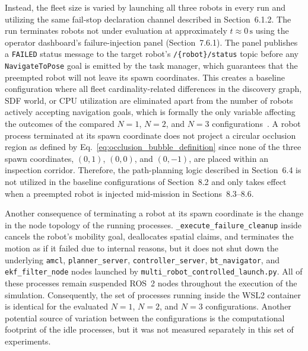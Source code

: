 Instead, the fleet size is varied by launching all three robots in every run and utilizing the same fail-stop declaration channel described in Section~6.1.2. The run terminates robots not under evaluation at approximately $t \approx 0\,\text{s}$ using the operator dashboard's failure-injection panel (Section~7.6.1). The panel publishes a \texttt{FAILED} status message to the target robot's \texttt{/\{robot\}/status} topic before any \texttt{NavigateToPose} goal is emitted by the task manager, which guarantees that the preempted robot will not leave its spawn coordinates. This creates a baseline configuration where all fleet cardinality-related differences in the discovery graph, SDF world, or CPU utilization are eliminated apart from the number of robots actively accepting navigation goals, which is formally the only variable affecting the outcomes of the compared $N=1$, $N=2$, and $N=3$ configurations~\cite{ribeiro2025indoor,francis2023benchmarking}. A robot process terminated at its spawn coordinate does not project a circular occlusion region as defined by Eq.~\eqref{eq:occlusion_bubble_definition} since none of the three spawn coordinates, $(0,1)$, $(0,0)$, and $(0,-1)$, are placed within an inspection corridor. Therefore, the path-planning logic described in Section~6.4 is not utilized in the baseline configurations of Section~8.2 and only takes effect when a preempted robot is injected mid-mission in Sections~8.3--8.6.

Another consequence of terminating a robot at its spawn coordinate is the change in the node topology of the running processes. \texttt{\_execute\_failure\_cleanup} inside  cancels the robot's mobility goal, deallocates spatial claims, and terminates the motion as if it failed due to internal reasons, but it does not shut down the underlying \texttt{amcl}, \texttt{planner\_server}, \texttt{controller\_server}, \texttt{bt\_navigator}, and \texttt{ekf\_filter\_node} nodes launched by \texttt{multi\_robot\_controlled\_launch.py}. All of these processes remain suspended ROS~2 nodes throughout the execution of the simulation. Consequently, the set of processes running inside the WSL2 container is identical for the evaluated $N=1$, $N=2$, and $N=3$ configurations. Another potential source of variation between the configurations is the computational footprint of the idle processes, but it was not measured separately in this set of experiments.

